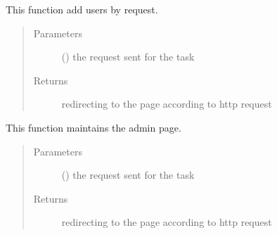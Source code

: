 \documentclass[letterpaper,10pt,english]{sphinxmanual}
\begin{document}

\begin{fulllineitems}
\label{\detokenize{janta:janta.views.add_users}}
This function add users by request.
\begin{quote}\begin{description}
\item[{Parameters}] \leavevmode
{} () \textendash{} the request sent for the task

\item[{Returns}] \leavevmode
redirecting to the page according to http request

\end{description}\end{quote}

\end{fulllineitems}


\begin{fulllineitems}
\label{\detokenize{janta:janta.views.admin}}
This function maintains the admin page.
\begin{quote}\begin{description}
\item[{Parameters}] \leavevmode
{} () \textendash{} the request sent for the task

\item[{Returns}] \leavevmode
redirecting to the page according to http request

\end{description}\end{quote}

\end{fulllineitems}

\end{document}
